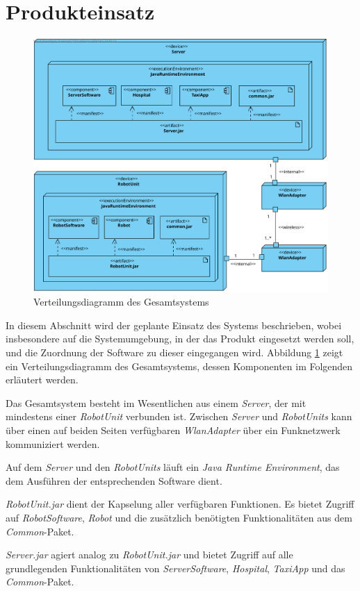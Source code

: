\section{Produkteinsatz}

\begin{figure}[H]
	\centering
	\includegraphics[width=1\textwidth]{img/2-Entwurf-9-Produkteinsatz}
	\caption{Verteilungsdiagramm des Gesamtsystems}
	\label{ProdukteinsatzKomp}
\end{figure}

In diesem Abschnitt wird der geplante Einsatz des Systems beschrieben, wobei
insbesondere auf die Systemumgebung, in der das Produkt eingesetzt werden soll,
und die Zuordnung der Software zu dieser eingegangen wird.
Abbildung \ref{ProdukteinsatzKomp}
zeigt ein Verteilungsdiagramm des Gesamtsystems, dessen Komponenten im Folgenden
erläutert werden.

Das Gesamtsystem besteht im Wesentlichen aus einem \emph{Server}, der mit mindestens einer
\emph{RobotUnit} verbunden ist. Zwischen \emph{Server} und \emph{RobotUnits} kann über
einen auf beiden Seiten verfügbaren \emph{Wlan\-Adapter} über ein
Funknetzwerk kommuniziert werden.

Auf dem \emph{Server} und den \emph{RobotUnits} läuft ein \emph{Java Runtime Environment},
das dem Ausführen der entsprechenden Software dient.

\emph{RobotUnit.jar} dient der Kapselung aller verfügbaren Funktionen. Es bietet Zugriff
auf \emph{RobotSoftware}, \emph{Robot} und  die zusätzlich benötigten Funktionalitäten
 aus dem \emph{Common}-Paket.

\emph{Server.jar} agiert analog zu \emph{RobotUnit.jar} und bietet Zugriff auf alle grundlegenden
Funktionalitäten von \emph{ServerSoftware}, \emph{Hospital}, \emph{TaxiApp} und
das \emph{Common}-Paket.
